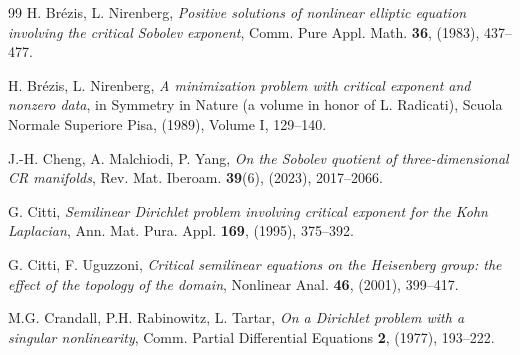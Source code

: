\documentclass[11pt]{amsart}
\numberwithin{equation}{section} %
\theoremstyle{definition}
\begin{document}
\begin{thebibliography}{99}
	H. Br\'{e}zis, L. Nirenberg, 
	{\em Positive solutions of nonlinear elliptic equation involving the critical Sobolev exponent}, 
	Comm. Pure Appl. Math. {\bf 36}, (1983), 437--477. 
	
	
	H. Br\'{e}zis, L. Nirenberg, 
	{\em A minimization problem with critical exponent and nonzero data}, 
	in Symmetry in Nature (a volume in honor of L. Radicati), Scuola Normale Superiore Pisa, (1989), Volume I, 129--140.
	
	
	
	
	J.-H. Cheng, A. Malchiodi, P. Yang,
	{\em On the Sobolev quotient
	of three-dimensional CR manifolds},
	Rev. Mat. Iberoam. {\bf 39}(6), (2023), 2017--2066.
	
	G. Citti,
	{\em Semilinear Dirichlet problem involving critical exponent for the Kohn Laplacian}, 
	Ann. Mat. Pura. Appl. {\bf 169}, (1995), 375--392.
	
	G. Citti, F. Uguzzoni, 
	{\em Critical semilinear equations on the Heisenberg group: the effect of the
		topology of the domain}, Nonlinear Anal. {\bf 46}, (2001), 399--417.
	
	
	
	M.G. Crandall, P.H. Rabinowitz, L. Tartar,
	{\em On a Dirichlet problem with a singular nonlinearity},
	Comm. Partial Differential Equations {\bf 2}, (1977), 193--222.
	

\end{thebibliography}
\end{document}
